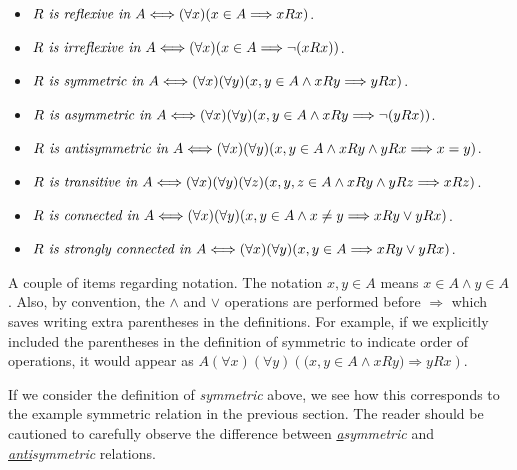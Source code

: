 \begin{itemize}
\item $R \textit{ is reflexive in }\index{reflexive} A \Longleftrightarrow (\forall x)(x \in A \Longrightarrow x R x)$.
\item $R \textit{ is irreflexive in }\index{irreflexive} A \Longleftrightarrow (\forall x)(x \in A \Longrightarrow \neg (x R x))$.
\item $R \textit{ is symmetric in }\index{symmetric} A \Longleftrightarrow (\forall x)(\forall y)(x,y \in A  \land x R y \Longrightarrow  y R x)$.
\item $R \textit{ is asymmetric in }\index{asymmetric} A \Longleftrightarrow (\forall x)(\forall y)(x,y \in A \land x R y \Longrightarrow \neg (y R x))$.
\item $R \textit{ is antisymmetric in }\index{antisymmetric} A \Longleftrightarrow (\forall x)(\forall y)(x,y \in A \land x R y \land y R x \Longrightarrow x = y)$.
\item $R \textit{ is transitive in }\index{transitive}A \Longleftrightarrow (\forall x)(\forall y)(\forall z)(x,y,z \in A \land x R y \land y R z \Longrightarrow x R z)$.
\item $R \textit{ is connected in }\index{connected} A \Longleftrightarrow (\forall x)(\forall y)(x,y \in A \land x \ne y \Longrightarrow x R y \lor y  R x)$.
\item $R \textit{ is strongly connected in }\index{strongly connected} A \Longleftrightarrow (\forall x)(\forall y)(x,y \in A \Longrightarrow x R y \lor y R x)$.

\end{itemize}

A couple of items regarding notation.  The notation $x,y \in A$ means $x \in A \land y \in A$.  Also, by convention, the $\land$ and $\lor$ operations are performed before $\Longrightarrow$ which saves writing extra parentheses in the definitions.  For example, if we explicitly included the parentheses in the definition of symmetric to indicate order of operations, it would appear as $A(\forall x)(\forall y)(\textbf{(}x,y \in A  \land x R y \textbf{)} \Longrightarrow  y R x)$.

If we consider the definition of \textit{symmetric} above, we see how this corresponds to the example symmetric  relation in the previous section.  The reader should be cautioned to carefully observe the difference between \textit{\underline{a}symmetric} and \textit{\underline{anti}symmetric} relations.\\

